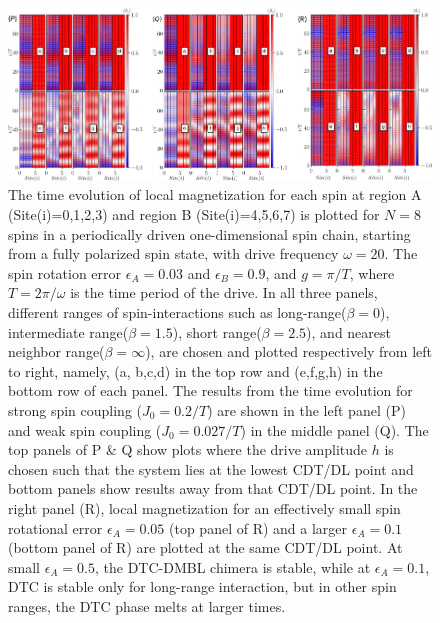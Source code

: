 \documentclass[
nofootinbib,
reprint,
superscriptaddress,
amsmath,amssymb,showkeys,
aps,
prb,
]{revtex4-2}
\begin{document}
	\begin{figure}[t!]
		\centering
		\includegraphics[width=17.5cm]{sz_t_strongweakJ_ea_N_8.pdf}
		\caption{The time evolution of local magnetization for each spin at region A (Site(i)=0,1,2,3) and region B (Site(i)=4,5,6,7) is plotted for $N=8$ spins in a periodically driven one-dimensional spin chain, starting from a fully polarized spin state, with drive frequency $\omega=20$. The spin rotation error $\epsilon_A = 0.03$ and $\epsilon_B = 0.9$, and $g=\pi/T$, where $T=2\pi/\omega$ is the time period of the drive.  In all three panels, different ranges of spin-interactions such as long-range($\beta=0$), intermediate range($\beta=1.5$), short range($\beta=2.5$), and nearest neighbor range($\beta=\infty$), are chosen and plotted respectively from left to right, namely, (a, b,c,d) in the top row and (e,f,g,h) in the bottom row of each panel. The results from the time evolution for strong spin coupling ($J_0 = 0.2/T$) are shown in the left panel (P) and weak spin coupling ($J_0 = 0.027/T$) in the middle panel (Q). The top panels of P \& Q show plots  where the drive amplitude $h$ is chosen such that the system lies at the lowest CDT/DL point and bottom panels show results away from that CDT/DL point. In the right panel (R), local magnetization for an effectively small spin rotational error $\epsilon_A = 0.05$ (top panel of R) and a larger $\epsilon_A = 0.1$ (bottom panel of R) are plotted at the same CDT/DL point. At small $\epsilon_A=0.5$, the DTC-DMBL chimera is stable, while at $\epsilon_A=0.1$, DTC is stable only for long-range interaction, but in other spin ranges, the DTC phase melts at larger times.}
		\label{Fig:strong_weak_ea}
	\end{figure}
\end{document}
